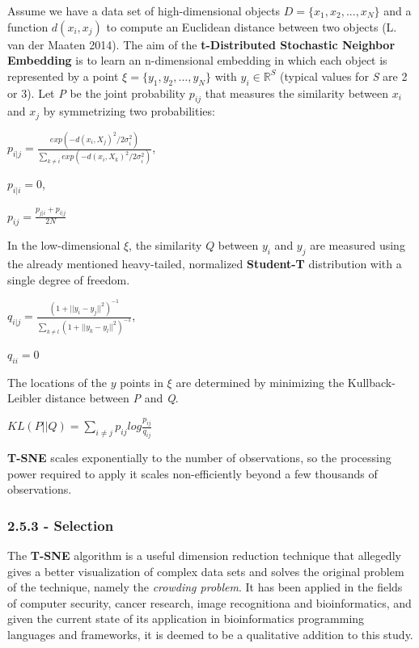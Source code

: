\documentclass[]{article}
\begin{document}
Assume we have a data set of high-dimensional objects
\(D = \{x_1, x_2,...,x_N\}\) and a function \(d(x_i,x_j)\) to compute an
Euclidean distance between two objects (L. van der Maaten 2014). The aim
of the \textbf{t-Distributed Stochastic Neighbor Embedding} is to learn
an n-dimensional embedding in which each object is represented by a
point \(\xi = \{y_1, y_2, ..., y_N\}\) with \(y_i \in \mathbb{R}^S\)
(typical values for \emph{S} are 2 or 3). Let \emph{P} be the joint
probability \(p_{ij}\) that measures the similarity between \(x_i\) and
\(x_j\) by symmetrizing two probabilities:

\(p_{i|j} = \frac{exp(-d(x_i,X_j)^2/2\sigma_i^2)}{\sum_{k \neq i}exp(-d(x_i,X_k)^2/2\sigma_i^2)}\),

\(p_{i|i} = 0\),

\(p_{ij} = \frac{p_{j|i} + p_{i|j}}{2N}\)

In the low-dimensional \(\xi\), the similarity \(Q\) between \(y_i\) and
\(y_j\) are measured using the already mentioned heavy-tailed,
normalized \textbf{Student-T} distribution with a single degree of
freedom.

\(q_{i|j} = \frac{(1 + ||y_i - y_j||^2)^{-1}}{\sum_{k \neq l}(1 + ||y_k - y_l||^2)^{-1}}\),

\(q_{ii} = 0\)

The locations of the \(y\) points in \(\xi\) are determined by
minimizing the Kullback-Leibler distance between \emph{P} and \emph{Q}.

\(KL(P||Q) = \sum_{i \neq j} p_{ij} log \frac{p_{ij}}{q_{ij}}\)

\textbf{T-SNE} scales exponentially to the number of observations, so
the processing power required to apply it scales non-efficiently beyond
a few thousands of observations.

\subsubsection{2.5.3 - Selection}\label{selection-3}

The \textbf{T-SNE} algorithm is a useful dimension reduction technique
that allegedly gives a better visualization of complex data sets and
solves the original problem of the technique, namely the \emph{crowding
problem}. It has been applied in the fields of computer security, cancer
research, image recognitiona and bioinformatics, and given the current
state of its application in bioinformatics programming languages and
frameworks, it is deemed to be a qualitative addition to this study.
\end{document}

